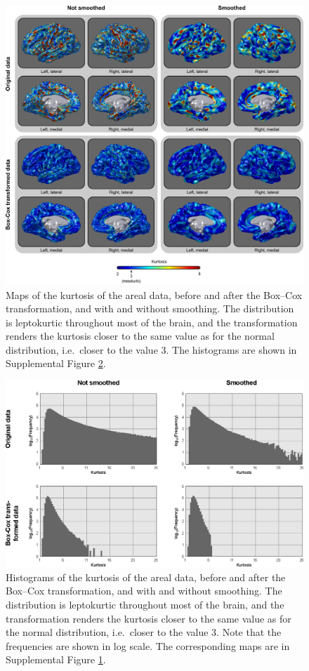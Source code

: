 \begin{figure}[!p]  %
\centering
\includegraphics[width=14cm]{images/kurtosis.png}
\caption[Maps of the kurtosis of the areal data.]{Maps of the kurtosis of the areal data, before and after the Box--Cox transformation, and with and without smoothing. The distribution is leptokurtic throughout most of the brain, and the transformation renders the kurtosis closer to the same value as for the normal distribution, i.e.\ closer to the value 3. The histograms are shown in Supplemental Figure \ref{fig:kurtosis-hist}.}
\label{fig:kurtosis}
\end{figure}

\begin{figure}[!p]  %
\centering
\includegraphics[width=14cm]{images/kurtosis-hist.eps}
\caption[Histograms of the kurtosis of the areal data.]{Histograms of the kurtosis of the areal data, before and after the Box--Cox transformation, and with and without smoothing. The distribution is leptokurtic throughout most of the brain, and the transformation renders the kurtosis closer to the same value as for the normal distribution, i.e.\ closer to the value 3.  Note that the frequencies are shown in log scale. The corresponding maps are in Supplemental Figure \ref{fig:kurtosis}.}
\label{fig:kurtosis-hist}
\end{figure}

